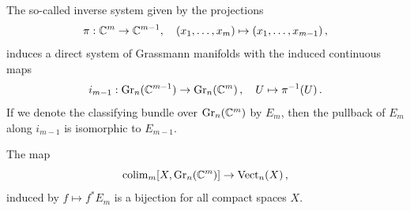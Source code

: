  \begin{corollary} \label{cor:kTheo-directGrassmanSystem}
	The so-called inverse system given by the projections 
	\begin{equation*}
		\pi: \mathbb{C}^m \to \mathbb{C}^{m-1},\quad (x_1,\dots,x_m)\mapsto (x_1,\dots,x_{m-1})\,,
	\end{equation*}induces a direct system of Grassmann manifolds with the induced continuous maps
	\begin{equation*}
		i_{m-1}: \operatorname{\mathrm{Gr}}_n(\mathbb{C}^{m-1}) \to \operatorname{\mathrm{Gr}}_n(\mathbb{C}^{m})\,,\quad U\mapsto \pi^{-1}(U)\,.
	\end{equation*} If we denote the classifying bundle over $\operatorname{\mathrm{Gr}}_n(\mathbb{C}^m)$ by $E_m$, then the pullback of $E_m$ along $i_{m-1}$ is isomorphic to $E_{m-1}$.
 \end{corollary}
 \begin{theorem}
	\label{thm:kTheory-classifyingSpace}
	The map 
	\begin{equation*}
		\operatorname{\mathrm{colim}}_{m} [X,\operatorname{\mathrm{Gr}}_n(\mathbb{C}^m)] \to \operatorname{\mathrm{Vect}}_n(X)\,,
	\end{equation*} induced by $f\mapsto f^*E_m$ is a bijection for all compact spaces $X$.
 \end{theorem}
